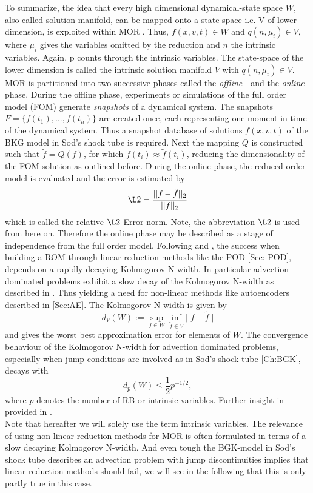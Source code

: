To summarize, the idea that every high dimensional dynamical-state space \(W\), also called solution
manifold, can be mapped onto a state-space i.e. V of lower dimension, is exploited within MOR \cite{ohlberger2015reduced}. Thus, \(f(x, v, t) \in W\) and \(q(n,\mu_i) \in V\), where \(\mu_i\) gives the variables omitted by the reduction and \(n\) the intrinsic variables. Again, p counts through the intrinsic variables. The state-space of the lower dimension is called the intrinsic solution manifold \(V\) with \(q(n, \mu_i) \in V\)\cite{Carlberg}.
MOR is partitioned into two successive phases called the \textit{offline} - and the \textit{online} phase. During the offline phase, experiments or simulations of the full order model (FOM) generate \textit{snapshots} of a dynamical system. The snapshots \(F = \{f(t_1),...,f(t_n)\}\) are created once, each representing one moment in time of the dynamical system. Thus a snapshot database of solutions \(f(x,v,t)\) of the BKG model in Sod's shock tube is required. Next the mapping \(Q\) is constructed such that \(\tilde{f} = Q(f)\), for which \(f(t_i) \approx \tilde{f}(t_i)\), reducing the dimensionality of the FOM solution as outlined before. During the online phase, the reduced-order model is evaluated and the error is estimated by
\begin{equation}
	\L2 = \frac{||f - \tilde{f} ||_2}{||f||_2}
\end{equation}
which is called the relative \(\L2\)-Error norm. Note, the abbreviation \(\L2\) is used from here on. Therefore the online phase may be described as a stage of independence from the full order model.
Following \cite{ohlberger2015reduced} and \cite{Carlberg}, the success when building a ROM through linear reduction methods like the POD \cref{Sec: POD}, depends on a rapidly decaying Kolmogorov N-width. In particular advection dominated problems exhibit a slow decay of the Kolmogorov N-width as described in \cite{ohlberger2015reduced}. Thus yielding a need for non-linear methods like autoencoders described in \cref{Sec:AE}. The Kolmogorov N-width is given by
\begin{equation}
	d_{V}(W):= \sup_{f \in W} \inf_{\tilde{f} \in V} ||f-\tilde{f}||
	\label{Eq:Kolmogorov}
\end{equation}
and gives the worst best approximation error for elements of \(W\). The convergence behaviour of the Kolmogorov N-width for advection dominated problems, especially when jump conditions are involved as in Sod's shock tube \cref{Ch:BGK}, decays with
\begin{equation}
	d_p(W) \leq \frac{1}{2} p^{-1/2},
	\label{Eq:KolmoAdv}
\end{equation}
where \(p\) denotes the number of RB or intrinsic variables. Further insight in provided in \cite{ohlberger2015reduced}.\\
Note that hereafter we will solely use the term intrinsic variables. The relevance of using non-linear reduction methods for MOR is often formulated in terms of a slow decaying Kolmogorov N-width. And even tough the BGK-model in Sod's shock tube describes an advection problem with jump discontinuities implies that linear reduction methods should fail, we will see in the following that this is only partly true in this case.
